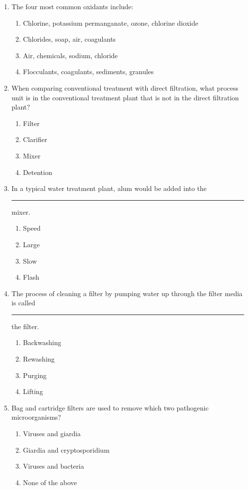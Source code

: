\begin{enumerate}
\item The four most common oxidants include:
\begin{enumerate}
\item Chlorine, potassium permanganate, ozone, chlorine dioxide
\item Chlorides, soap, air, coagulants
\item Air, chemicals, sodium, chloride
\item Flocculants, coagulants, sediments, granules
\end{enumerate}

\item When comparing conventional treatment with direct filtration, what process unit is in the conventional treatment plant that is not in the direct filtration plant?
\begin{enumerate}
\item Filter
\item Clarifier
\item Mixer
\item Detention
\end{enumerate}

\item In a typical water treatment plant, alum would be added into the \rule{1cm}{0.5pt}  mixer.
\begin{enumerate}
\item Speed
\item Large
\item Slow
\item Flash
\end{enumerate}

\item The process of cleaning a filter by pumping water up through the filter media is called \rule{1cm}{0.5pt}  the filter.
\begin{enumerate}
\item Backwashing
\item Rewashing
\item Purging
\item Lifting
\end{enumerate}

\item Bag and cartridge filters are used to remove which two pathogenic microorganisms?
\begin{enumerate}
\item Viruses and giardia
\item Giardia and cryptosporidium
\item Viruses and bacteria
\item None of the above
\end{enumerate}


\end{enumerate}
